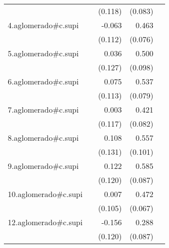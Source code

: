 {\begin{longtable}{l*{4}{D{.}{.}{-1}}}
            &                     &     (0.118)         &     (0.083)         &                     \\
\addlinespace
4.aglomerado#c.supi&                     &      -0.063         &       0.463\sym{***}&                     \\
            &                     &     (0.112)         &     (0.076)         &                     \\
\addlinespace
5.aglomerado#c.supi&                     &       0.036         &       0.500\sym{***}&                     \\
            &                     &     (0.127)         &     (0.098)         &                     \\
\addlinespace
6.aglomerado#c.supi&                     &       0.075         &       0.537\sym{***}&                     \\
            &                     &     (0.113)         &     (0.079)         &                     \\
\addlinespace
7.aglomerado#c.supi&                     &       0.003         &       0.421\sym{***}&                     \\
            &                     &     (0.117)         &     (0.082)         &                     \\
\addlinespace
8.aglomerado#c.supi&                     &       0.108         &       0.557\sym{***}&                     \\
            &                     &     (0.131)         &     (0.101)         &                     \\
\addlinespace
9.aglomerado#c.supi&                     &       0.122         &       0.585\sym{***}&                     \\
            &                     &     (0.120)         &     (0.087)         &                     \\
\addlinespace
10.aglomerado#c.supi&                     &       0.007         &       0.472\sym{***}&                     \\
            &                     &     (0.105)         &     (0.067)         &                     \\
\addlinespace
12.aglomerado#c.supi&                     &      -0.156         &       0.288\sym{***}&                     \\
            &                     &     (0.120)         &     (0.087)         &                     \\

\end{longtable}}
